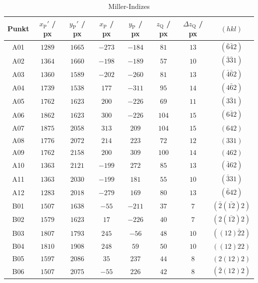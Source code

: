 \begin{table}[H]
    \centering
    \caption{Miller-Indizes}
    \begin{tabular}{c|c|c|c|c|c|c|c}
        Punkt & $x_{\mathrm{P}}'$ / px & $y_{\mathrm{P}}'$ / px & $x_{\mathrm{P}}$ / px & $y_{\mathrm{P}}$ / px & $z_{\mathrm{Q}}$ / px & $\Delta z_{\mathrm{Q}}$ / px & $(hkl)$ \\
        \hline
        A01 & $1289$ & $1665$ & $-273$ & $-184$ & $ 81$ & $13$ & $(\bar{6}\bar{4}2)$ \\
        A02 & $1364$ & $1660$ & $-198$ & $-189$ & $ 57$ & $10$ & $(\bar{3}\bar{3}1)$ \\
        A03 & $1360$ & $1589$ & $-202$ & $-260$ & $ 81$ & $13$ & $(\bar{4}\bar{6}2)$ \\
        A04 & $1739$ & $1538$ & $ 177$ & $-311$ & $ 95$ & $14$ & $(4\bar{6}2)$ \\
        A05 & $1762$ & $1623$ & $ 200$ & $-226$ & $ 69$ & $11$ & $(3\bar{3}1)$ \\
        A06 & $1862$ & $1623$ & $ 300$ & $-226$ & $104$ & $15$ & $(6\bar{4}2)$ \\
        A07 & $1875$ & $2058$ & $ 313$ & $ 209$ & $104$ & $15$ & $(642)$ \\
        A08 & $1776$ & $2072$ & $ 214$ & $ 223$ & $ 72$ & $12$ & $(331)$ \\
        A09 & $1762$ & $2158$ & $ 200$ & $ 309$ & $100$ & $14$ & $(462)$ \\
        A10 & $1363$ & $2121$ & $-199$ & $ 272$ & $ 85$ & $13$ & $(\bar{4}62)$ \\
        A11 & $1363$ & $2030$ & $-199$ & $ 181$ & $ 55$ & $10$ & $(\bar{3}31)$ \\
        A12 & $1283$ & $2018$ & $-279$ & $ 169$ & $ 80$ & $13$ & $(\bar{6}42)$ \\
        B01 & $1507$ & $1638$ & $ -55$ & $-211$ & $ 37$ & $ 7$ & $(\bar{2}(\bar{12})2)$ \\
        B02 & $1579$ & $1623$ & $  17$ & $-226$ & $ 40$ & $ 7$ & $(2(\bar{12})2)$ \\
        B03 & $1807$ & $1793$ & $ 245$ & $ -56$ & $ 48$ & $10$ & $((12)\bar{2}2)$ \\
        B04 & $1810$ & $1908$ & $ 248$ & $  59$ & $ 50$ & $10$ & $((12)22)$ \\
        B05 & $1597$ & $2086$ & $  35$ & $ 237$ & $ 44$ & $ 8$ & $(2(12)2)$ \\
        B06 & $1507$ & $2075$ & $ -55$ & $ 226$ & $ 42$ & $ 8$ & $(\bar{2}(12)2)$ \\

\end{tabular}
\end{table}
